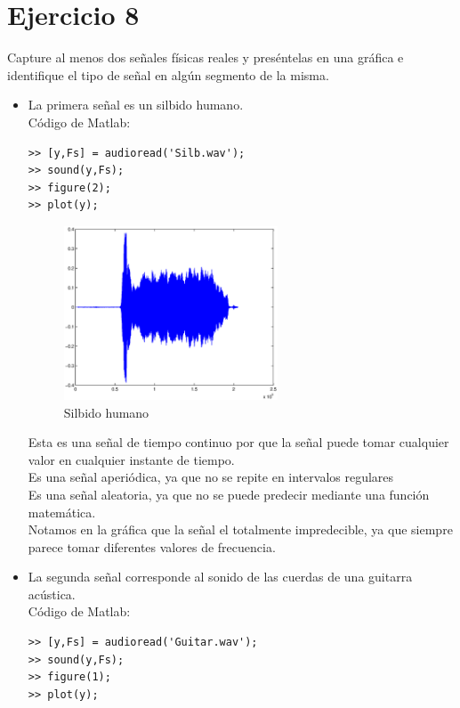 \documentclass[10pt,a4paper]{report}
\begin{document}
\section{Ejercicio 8}
Capture al menos dos señales físicas reales y preséntelas en una  gráfica e identifique el tipo de señal en algún segmento de la misma.\\

\begin{itemize}
\item La primera señal es un silbido humano.\\
Código de Matlab:\\
\begin{lstlisting}[frame=single]
>> [y,Fs] = audioread('Silb.wav');
>> sound(y,Fs);
>> figure(2);
>> plot(y);
\end{lstlisting}

\begin{figure}[htb]
\centering
\includegraphics[width=0.6\textwidth]{SilbGraphic}
\caption{Silbido humano}
\label{fig:SilbGraphic}
\end{figure}

Esta es una señal de tiempo continuo por que la señal puede tomar cualquier valor en cualquier instante de tiempo. \\
Es una señal aperiódica, ya que no se repite en intervalos regulares \\
Es una señal aleatoria, ya que no se puede predecir mediante una función matemática.\\
Notamos en la gráfica que la señal el totalmente impredecible, ya que siempre parece tomar diferentes valores de frecuencia.

\item La segunda señal corresponde al sonido de las cuerdas de una guitarra acústica.\\
Código de Matlab:\\
\begin{lstlisting}[frame=single]
>> [y,Fs] = audioread('Guitar.wav');
>> sound(y,Fs);
>> figure(1);
>> plot(y);
\end{lstlisting}


\end{itemize}
\end{document}
